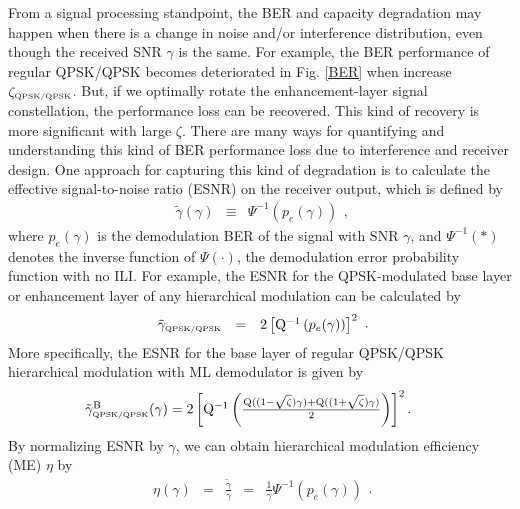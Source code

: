 \documentclass[conference]{IEEEtran}
\begin{document}
From a signal processing standpoint, the BER and capacity
degradation may happen when there is a change in noise and/or
interference distribution, even though the received SNR $\gamma$
is the same. For example, the BER performance of regular QPSK/QPSK
becomes deteriorated in Fig. \ref{BER} when increase
$\zeta_{\mbox{\tiny QPSK/QPSK}}$. But, if we optimally rotate the
enhancement-layer signal constellation, the performance loss can
be recovered. This kind of recovery is more significant with large
$\zeta$. There are many ways for quantifying and understanding
this kind of BER performance loss due to interference and receiver
design. One approach for capturing this kind of degradation is to
calculate the effective signal-to-noise ratio (ESNR) on the
receiver output, which is defined by
\begin{equation}
\begin{array}{rcl}
\tilde{\gamma}\left(\gamma\right)&\equiv&\Psi^{-1}\left(p_{e}(\gamma)\right)
\end{array},\label{eff_SNR}
\end{equation}
\noindent where $p_{e}(\gamma)$ is the demodulation BER of the
signal with SNR $\gamma$, and $\Psi^{-1}\left(\ast\right)$ denotes
the inverse function of $\Psi\left(\cdot\right)$, the demodulation
error probability function with no ILI. For example, the ESNR for
the QPSK-modulated base layer or enhancement layer of any
hierarchical modulation can be calculated by
\begin{equation}
\begin{array}{rcl}
\tilde{\gamma}_{\mbox{\tiny QPSK/QPSK}}&=&2\left[{\rm
Q}^{-1}\left(p_{e}(\gamma)\right)\right]^2
\end{array}.\label{eff_SNR_QPSK}
\end{equation}
\noindent More specifically, the ESNR for the base layer of
regular QPSK/QPSK hierarchical modulation with ML demodulator is
given by
\begin{equation}\hspace{-0.225in}
\begin{array}{l}
\tilde{\gamma}_{\mbox{\tiny QPSK/QPSK}}^{\rm
B}(\gamma)=2\left[{\rm Q}^{-1}\left(\frac{{\rm
Q}((1-\sqrt{\zeta})\gamma)+{\rm
Q}((1+\sqrt{\zeta})\gamma)}{2}\right)\right]^2.
\end{array}\label{eff_SNR_QPSK_QPSK}
\end{equation}
\noindent By normalizing ESNR by $\gamma$, we can obtain
hierarchical modulation efficiency (ME) $\eta$ by
\begin{equation}
\begin{array}{rcccl}
\eta\left(\gamma\right)&=&\frac{\tilde{\gamma}}{\gamma}&=&\frac{1}{\gamma}\Psi^{-1}\left(p_{e}(\gamma)\right)
\end{array}.\label{mod_eff}
\end{equation}
\end{document}
